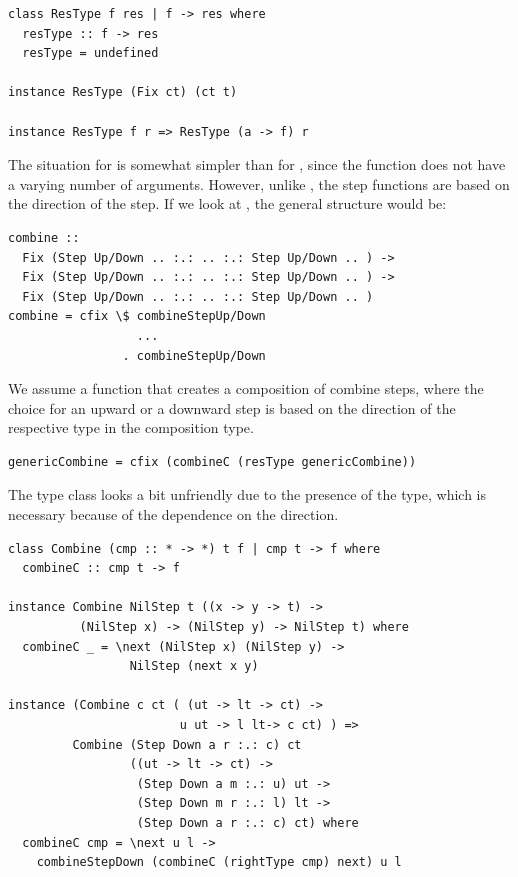 \documentclass[preprint,natbib]{sigplanconf}
\begin{document}
\begin{small}
\begin{verbatim}
class ResType f res | f -> res where
  resType :: f -> res
  resType = undefined

instance ResType (Fix ct) (ct t)
  
instance ResType f r => ResType (a -> f) r
\end{verbatim}
\end{small}




The situation for  is somewhat simpler than for , since the function does not have a varying number of arguments. However, unlike , the step functions are based on the direction of the step. If we look at , the general structure would be:

\begin{small}
\begin{verbatim}
combine :: 
  Fix (Step Up/Down .. :.: .. :.: Step Up/Down .. ) ->
  Fix (Step Up/Down .. :.: .. :.: Step Up/Down .. ) ->
  Fix (Step Up/Down .. :.: .. :.: Step Up/Down .. )
combine = cfix \$ combineStepUp/Down 
                  ...
                . combineStepUp/Down 
\end{verbatim}%
\end{small}

We assume a function that creates a composition of  combine steps, where the choice for an upward or a downward step is based on the direction of the respective  type in the composition type.


\begin{small}
\begin{verbatim}
genericCombine = cfix (combineC (resType genericCombine))
\end{verbatim}%
\end{small}

The type class looks a bit unfriendly due to the presence of the  type, which is necessary because of the dependence on the direction.

\begin{small}
\begin{verbatim}
class Combine (cmp :: * -> *) t f | cmp t -> f where
  combineC :: cmp t -> f

instance Combine NilStep t ((x -> y -> t) -> 
          (NilStep x) -> (NilStep y) -> NilStep t) where
  combineC _ = \next (NilStep x) (NilStep y) ->
                 NilStep (next x y) 
 
instance (Combine c ct ( (ut -> lt -> ct) ->
                        u ut -> l lt-> c ct) ) =>
         Combine (Step Down a r :.: c) ct
                 ((ut -> lt -> ct) ->
                  (Step Down a m :.: u) ut -> 
                  (Step Down m r :.: l) lt -> 
                  (Step Down a r :.: c) ct) where
  combineC cmp = \next u l ->
    combineStepDown (combineC (rightType cmp) next) u l
\end{verbatim}
\end{small}
\end{document}
